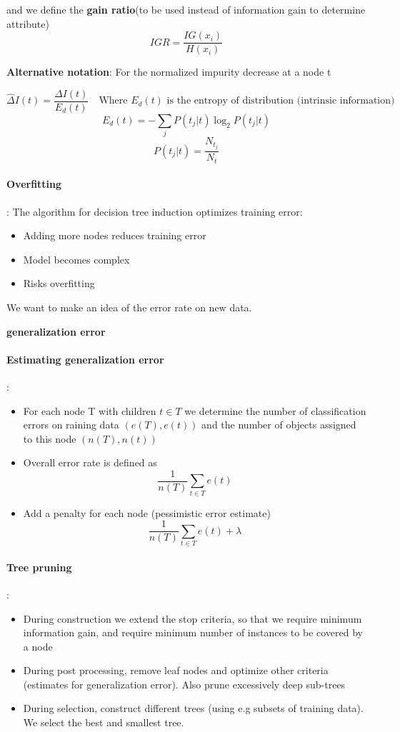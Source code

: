 \documentclass{article}
\begin{document}
and we define the \textbf{gain ratio}(to be used instead of information gain to determine attribute)
\[IGR = \frac{IG(x_i)}{H(x_i)}\]


\textbf{Alternative notation}: For the normalized impurity decrease at a node t

\[\hat{\Delta}I(t) = \frac{\Delta I(t)}{E_d(t)} \quad \text{Where $E_d(t)$ is the entropy of distribution (intrinsic information)}\]
\[E_d(t) = -\sum_j P(t_j|t)\log_2P(t_j|t)\]
\[P(t_j|t) = \frac{N_{t_j}}{N_t}\]

\paragraph{Overfitting}: The algorithm for decision tree induction optimizes training error:
\begin{itemize}
  \item Adding more nodes reduces training error
  \item Model becomes complex
  \item Risks overfitting
\end{itemize}
We want to make an idea of the error rate on new data.
\begin{center}
  \textbf{generalization error}  
\end{center}

\paragraph{Estimating generalization error}: 
\begin{itemize}
  \item For each node T with children $t\in T$ we determine the number of classification errors on raining data $(e(T),e(t))$ and the number of objects assigned to this node $(n(T),n(t))$
  \item Overall error rate is defined as
  \[\frac{1}{n(T)}\sum_{t\in T}e(t)\]
  \item Add a penalty for each node (pessimistic error estimate)
  \[\frac{1}{n(T)}\sum_{t\in T}e(t) + \lambda \]  
\end{itemize}

\paragraph{Tree pruning}: 
\begin{itemize}
  \item During construction we extend the stop criteria, so that we require minimum information gain, and require minimum number of instances to be covered by a node
  \item During post processing, remove leaf nodes and optimize other criteria (estimates for generalization error). Also prune excessively deep sub-trees
  \item During selection, construct different trees (using e.g subsets of training data). We select the best and smallest tree.
\end{itemize}
\end{document}
